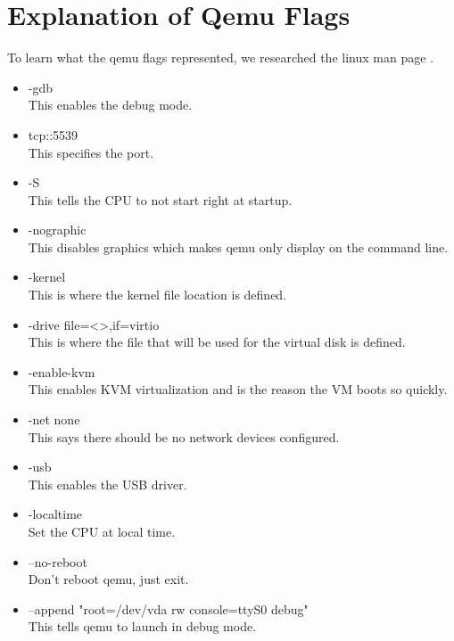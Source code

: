 \documentclass[letterpaper,10pt,draftclsnofoot,onecolumn,titlepage]{IEEEtran}
\begin{document}
\section{Explanation of Qemu Flags}
To learn what the qemu flags represented, we researched the linux man page \cite{Qemu-kvm}.
\begin{itemize}
\item -gdb \\
	This enables the debug mode. 
\item tcp::5539 \\
	This specifies the port.  
\item -S \\
	This tells the CPU to not start right at startup. 
\item -nographic \\
	This disables graphics which makes qemu only display on the command line. 
\item -kernel \\
	This is where the kernel file location is defined. 
\item -drive file=<>,if=virtio \\
	This is where the file that will be used for the virtual disk is defined. 
\item -enable-kvm \\
	This enables KVM virtualization and is the reason the VM boots so quickly. 
\item -net none \\
	This says there should be no network devices configured. 
\item -usb \\
	This enables the USB driver. 
\item -localtime \\
	Set the CPU at local time. 
\item --no-reboot \\
	Don't reboot qemu, just exit. 
\item --append "root=/dev/vda rw console=ttyS0 debug" \\
	This tells qemu to launch in debug mode.
\end{itemize}
\end{document}
